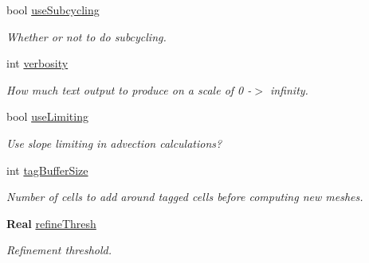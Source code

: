 \begin{DoxyCompactItemize}
\mbox{\label{struct_mushy_layer_options_ab64096542b22ce1e38b972854116f189}} 
bool \hyperlink{struct_mushy_layer_options_ab64096542b22ce1e38b972854116f189}{use\+Subcycling}
\begin{DoxyCompactList}\small\item\em Whether or not to do subcycling. \end{DoxyCompactList}\item 
\mbox{\label{struct_mushy_layer_options_ab8ba1fe9999541f8e83706d8c2fdbdc1}} 
int \hyperlink{struct_mushy_layer_options_ab8ba1fe9999541f8e83706d8c2fdbdc1}{verbosity}
\begin{DoxyCompactList}\small\item\em How much text output to produce on a scale of 0 -\/$>$ infinity. \end{DoxyCompactList}\item 
\mbox{\label{struct_mushy_layer_options_aa02f318d80e38081925d47679b9539b8}} 
bool \hyperlink{struct_mushy_layer_options_aa02f318d80e38081925d47679b9539b8}{use\+Limiting}
\begin{DoxyCompactList}\small\item\em Use slope limiting in advection calculations? \end{DoxyCompactList}\item 
\mbox{\label{struct_mushy_layer_options_aee00363c430d38cedff300e5fbfc6e22}} 
int \hyperlink{struct_mushy_layer_options_aee00363c430d38cedff300e5fbfc6e22}{tag\+Buffer\+Size}
\begin{DoxyCompactList}\small\item\em Number of cells to add around tagged cells before computing new meshes. \end{DoxyCompactList}\item 
\mbox{\label{struct_mushy_layer_options_ad4f7b1ce7b426d5a2a18b0fc0915c622}} 
\textbf{ Real} \hyperlink{struct_mushy_layer_options_ad4f7b1ce7b426d5a2a18b0fc0915c622}{refine\+Thresh}
\begin{DoxyCompactList}\small\item\em Refinement threshold. \end{DoxyCompactList}\item 
\mbox{\label{struct_mushy_layer_options_a35624a5dc740e78fdf2c3b4da9c30dc7}} 

\end{DoxyCompactItemize}
